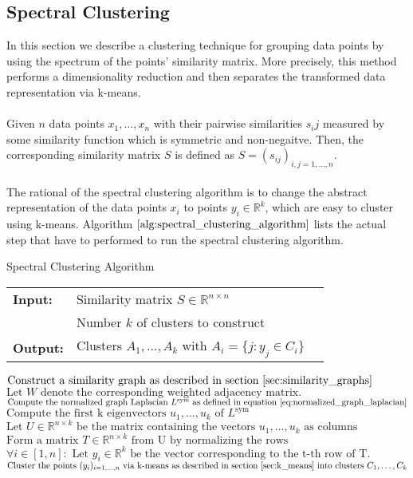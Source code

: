 \subsection{Spectral Clustering}
\label{sec:spectral_clustering_bg}
In this section we describe a clustering technique for grouping data points by using the spectrum of the points' similarity matrix. More precisely, this method performs a dimensionality reduction and then separates the transformed data representation via k-means. \\ \\
Given $n$ data points $x_1, \dots, x_n$ with their pairwise similarities $s_ij$ measured by some similarity function which is symmetric and non-negaitve. Then, the corresponding similarity matrix $S$ is defined as $S = (s_{ij})_{i,j=1,\dots,n}$. \\ \\
The rational of the spectral clustering algorithm is to change the abstract representation of the data points $x_i$ to points $y_i \in \mathbb{R}^k$, which are easy to cluster using k-means. Algorithm $\ref{alg:spectral_clustering_algorithm}$ lists the actual step that have to performed to run the spectral clustering algorithm.
\begin{algorithm}[H]
\caption{Spectral Clustering Algorithm}
\begin{table}[H]
  \begin{tabular}{@{}lll@{}}
    \textbf{Input:} & Similarity matrix $S \in \mathbb{R}^{n \times n}$ \\
		& Number $k$ of clusters to construct \\
    \textbf{Output:} & Clusters $A_1, \dots, A_k$ with $A_i = \{ j : y_j \in C_i\}$ \\
  \end{tabular} 
\end{table}
\setlength{\fboxrule}{0pt} 
\begin{boxedminipage}{1.0\textwidth}
  \begin{algorithmic}[1]
  	  \State $\text{Construct a similarity graph as described in section }\ref{sec:similarity_graphs}$
  	  \State $\text{Let } W \text{ denote the corresponding weighted adjacency matrix}.$
  	  \State $\text{Compute the normalized graph Laplacian } L^{\text{sym}} \text{ as defined in equation } \ref{eq:normalized_graph_laplacian}$
  	  \State $\text{Compute the first k eigenvectors } u_1,\dots,u_k \text{ of } L^{\text{sym}}$
  	  \State $\text{Let } U \in \mathbb{R}^{n \times k} \text{ be the matrix containing the vectors } u_1,\dots,u_k \text{ as columns}$
  	  \State $\text{Form a matrix } T \in \mathbb{R}^{n \times k} \text{ from U by normalizing the rows}$
  	  \State $\forall i \in \left[ 1, n \right]: \text{ Let } y_i \in \mathbb{R}^k \text{ be the vector corresponding to the t-th row of T.}$
  	  \State $\text{Cluster the points } (y_i)_{i=1,\dots,n} \text{ via k-means as described in section } \ref{sec:k_means} \text{ into clusters } C_1, \dots, C_k$
  \end{algorithmic}
  \end{boxedminipage}
  \vskip1.5pt
\label{alg:spectral_clustering_algorithm}
\end{algorithm}
